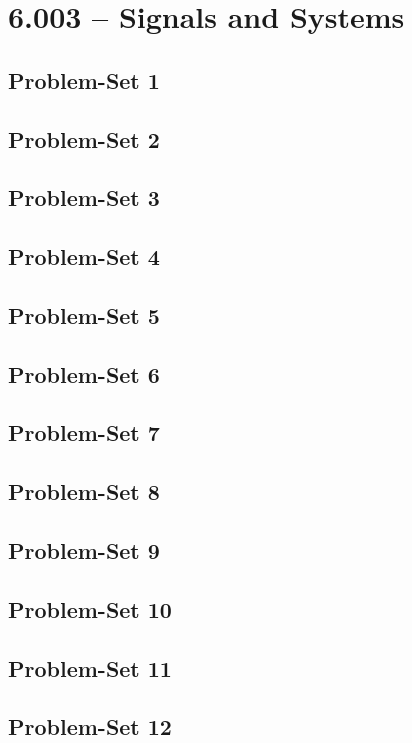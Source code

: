 \section{6.003 -- Signals and Systems}
\subsection{Problem-Set 1}
\subsection{Problem-Set 2}
\subsection{Problem-Set 3}
\subsection{Problem-Set 4}
\subsection{Problem-Set 5}
\subsection{Problem-Set 6}
\subsection{Problem-Set 7}
\subsection{Problem-Set 8}
\subsection{Problem-Set 9}
\subsection{Problem-Set 10}
\subsection{Problem-Set 11}
\subsection{Problem-Set 12}


